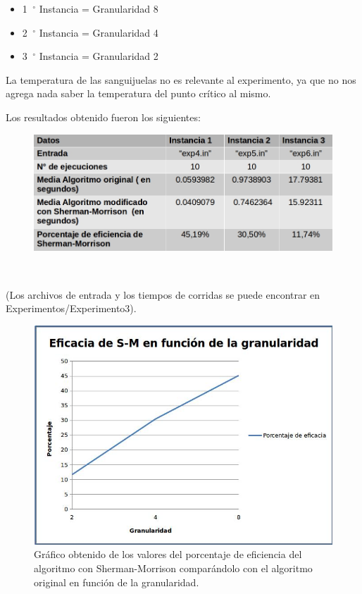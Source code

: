      \begin{itemize}
    \item 1\hspace{-1.5mm}$\phantom{a}^{\circ}$ Instancia = Granularidad 8
    \item 2\hspace{-1.5mm}$\phantom{a}^{\circ}$ Instancia = Granularidad 4
    \item 3\hspace{-1.5mm}$\phantom{a}^{\circ}$ Instancia  = Granularidad 2
 \end{itemize}
 
  La temperatura de las sanguijuelas no es relevante al experimento, ya que no nos agrega nada saber la temperatura del punto crítico al mismo.
  
  Los resultados obtenido fueron los siguientes:
  
     \begin{figure}[H]
    \centering
    \includegraphics[scale=0.5]{graphs/grafico3.jpg}
    \end{figure}\
        
         (Los archivos de entrada y los tiempos de corridas se puede encontrar en Experimentos/Experimento3).


    \begin{figure}[H]
    \centering
    \includegraphics[scale=0.6]{graphs/graf.jpg}\caption{Gráfico obtenido de los valores del porcentaje de eficiencia del algoritmo con Sherman-Morrison comparándolo con el algoritmo original en función de la granularidad.}
    \end{figure}


